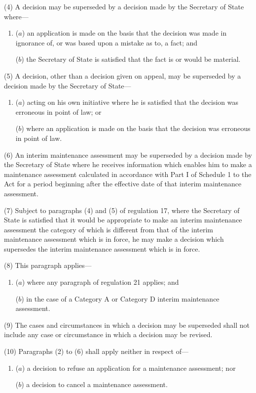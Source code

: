 \documentclass[a4paper,12pt]{article}
\begin{document}
(4) A decision may be superseded by a decision made by the Secretary of State where---
\begin{enumerate}\item[]
($a$) an application is made on the basis that the decision was made in ignorance of, or was based upon a mistake as to, a fact; and

($b$) the Secretary of State is satisfied that the fact is or would be material.
\end{enumerate}

(5) A decision, other than a decision given on appeal, may be superseded by a decision made by the Secretary of State---
\begin{enumerate}\item[]
($a$) acting on his own initiative where he is satisfied that the decision was erroneous in point of law; or

($b$) where an application is made on the basis that the decision was erroneous in point of law.
\end{enumerate}

(6) An interim maintenance assessment may be superseded by a decision made by the Secretary of State where he receives information which enables him to make a maintenance assessment calculated in accordance with Part I of Schedule 1 to the Act for a period beginning after the effective date of that interim maintenance assessment.

(7) Subject to paragraphs (4) and (5) of regulation 17, where the Secretary of State is satisfied that it would be appropriate to make an interim maintenance assessment the category of which is different from that of the interim maintenance assessment which is in force, he may make a decision which supersedes the interim maintenance assessment which is in force.

(8) This paragraph applies---
\begin{enumerate}\item[]
($a$) where any paragraph of regulation 21 applies; and

($b$) in the case of a Category A or Category D interim maintenance assessment.
\end{enumerate}

(9) The cases and circumstances in which a decision may be superseded shall not include any case or circumstance in which a decision may be revised.

(10) Paragraphs (2) to (6) shall apply neither in respect of---
\begin{enumerate}\item[]
($a$) a decision to refuse an application for a maintenance assessment; nor

($b$) a decision to cancel a maintenance assessment.
\end{enumerate}
\end{document}
